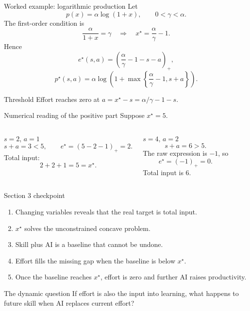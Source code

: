 \documentclass[aspectratio=169,10pt]{beamer}
\newcommand{\pos}[1]{\left(#1\right)_{+}}
\begin{document}
\begin{frame}{Worked example: logarithmic production}
Let
\[
p(x)=\alpha\log(1+x),
\qquad 0<\gamma<\alpha.
\]
The first-order condition is
\[
\frac{\alpha}{1+x}=\gamma
\quad\Longrightarrow\quad
x^\star=\frac{\alpha}{\gamma}-1.
\]
Hence
\[
e^\star(s,a)=
\pos{\frac{\alpha}{\gamma}-1-s-a},
\]
\[
p^\star(s,a)=
\alpha\log\!\left(
1+\max\left\{\frac{\alpha}{\gamma}-1,s+a\right\}
\right).
\]
\begin{exampleblock}{Threshold}
Effort reaches zero at $a=x^\star-s=\alpha/\gamma-1-s$.
\end{exampleblock}
\end{frame}

\begin{frame}{Numerical reading of the positive part}
Suppose $x^\star=5$.
\begin{columns}[T,onlytextwidth]
\begin{block}{$s=2$, $a=1$}
\[
s+a=3<5,
\qquad
e^\star=(5-2-1)_+=2.
\]
Total input:
\[
2+2+1=5=x^\star.
\]
\end{block}
\begin{alertblock}{$s=4$, $a=2$}
\[
s+a=6>5.
\]
The raw expression is $-1$, so
\[
e^\star=(-1)_+=0.
\]
Total input is $6$.
\end{alertblock}
\end{columns}
\end{frame}

\begin{frame}{Section 3 checkpoint}
\begin{enumerate}
  \item Changing variables reveals that the real target is total input.
  \item $x^\star$ solves the unconstrained concave problem.
  \item Skill plus AI is a baseline that cannot be undone.
  \item Effort fills the missing gap when the baseline is below $x^\star$.
  \item Once the baseline reaches $x^\star$, effort is zero and further AI raises productivity.
\end{enumerate}
\vspace{3mm}
\begin{alertblock}{The dynamic question}
If effort is also the input into learning, what happens to future skill when AI replaces current effort?
\end{alertblock}
\end{frame}
\end{document}
